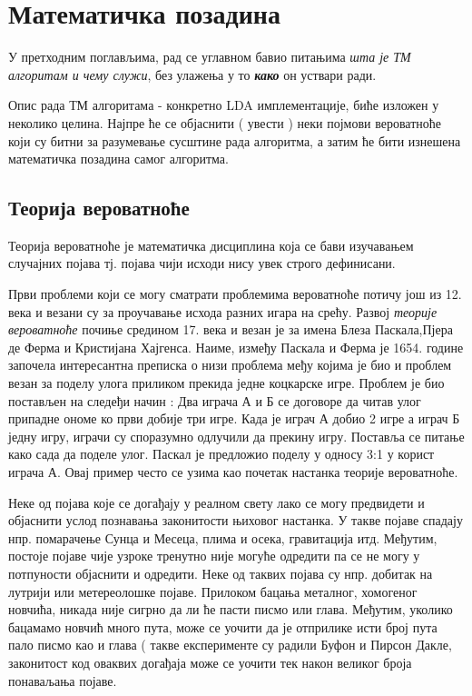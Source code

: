 \chapter{Математичка позадина}


У претходним поглављима, рад се углавном бавио питањима \textit{шта је ТМ алгоритам и чему  служи}, без улажења у то \textit{\textbf{како}} он уствари ради. 

Опис рада ТМ алгоритама - конкретно LDA имплементације, биће изложен у неколико целина. Најпре ће се објаснити ( увести ) неки  појмови вероватноће који су битни за разумевање сусштине рада алгоритма, а затим ће  бити изнешена математичка позадина самог алгоритма.

\section{Теорија вероватноће}

Теорија вероватноће је математичка дисциплина која се бави изучавањем случајних појава тј. појава чији исходи нису увек строго дефинисани.

Први проблеми који се могу сматрати проблемима вероватноће потичу још из 12. века и везани су за проучавање исхода разних игара на срећу.  Развој \textit{теорије вероватноће} почиње средином 17. века и везан је за имена Блеза Паскала,Пјера де Ферма и Кристијана Хајгенса. Наиме, између Паскала и Ферма је 1654. године започела интересантна преписка о низи проблема међу којима је био и проблем везан за поделу улога приликом прекида једне коцкарске игре. Проблем је био постављен на следеђи начин : Два играча А и Б се договоре да читав улог припадне ономе ко први добије три игре. Када је играч А добио 2 игре а играч Б једну игру, играчи су споразумно одлучили да прекину игру. Поставља се питање како сада да поделе улог. Паскал је предложио поделу у односу 3:1 у корист играча А.
Овај пример често се узима као почетак настанка теорије вероватноће.

Неке од појава које се догађају у реалном свету лако се могу предвидети и објаснити услод познавања законитости њиховог настанка. У такве појаве спадају нпр. помарачење Сунца и Месеца, плима и осека, гравитација итд.
Међутим, постоје појаве чије узроке тренутно није могуће одредити па се не могу у потпуности објаснити и одредити. Неке од таквих појава су нпр. добитак на лутрији или метереолошке појаве.
Прилоком бацања металног, хомогеног новчића, никада није сигрно да ли ће пасти писмо или глава. Међутим, уколико бацамамо новчић много пута, може се уочити да је отприлике исти број пута пало писмо као и глава ( такве експерименте су радили Буфон и Пирсон%
Дакле, законитост код оваквих догађаја може се уочити тек након великог броја понаваљања појаве.

